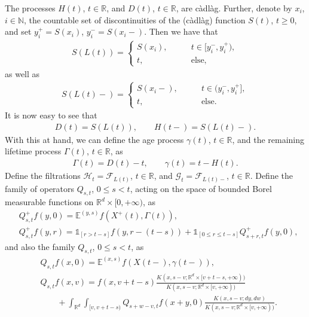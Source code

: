 \documentclass[reqno]{amsart}
\theoremstyle{remark}
\numberwithin{equation}{section} %
\newcommand{\NN}{\mathbb{N}}
\newcommand{\1}{\mathds{1}}
\begin{document}
	The processes $H(t)$, $t \in \mathbb{R}$, and $D(t)$, $t \in \mathbb{R}$, are càdlàg. Further, denote by $x_i$, $i\in\NN$, the countable set of discontinuities of the (càdlàg) function $S(t)$, $t\ge 0$,  and set $y_i^+ = S(x_i)$, $y_i^-=S(x_i-)$. Then we have that
	\begin{align}
		S(L(t)) = \begin{cases}
			S(x_i), \qquad & t \in [y_{i}^-, y_i^+), \\
			t, &  \text{else},
		\end{cases}
		\label{traj_over}
	\end{align}
	as well as
	\begin{align}
		S(L(t)-) = \begin{cases}
			S(x_i-), \qquad & t \in (y_{i}^-, y_i^+], \\
			t, &  \text{else.}
		\end{cases}
		\label{traj_under}
	\end{align}
	It is now easy to see that
	\begin{align}
		D(t) = S(L(t)) , \qquad H(t-) = S(L(t)-).
	\end{align}
	With this at hand, we can define the age process $\gamma(t)$, $t \in \mathbb{R}$, and the remaining lifetime process $\Gamma(t)$, $t \in \mathbb{R}$, as
	\begin{align}
		\Gamma (t) = D(t)-t, \qquad \gamma(t) = t-H(t).
	\end{align}
	Define the filtrations $\mathcal{H}_t= \mathcal{F}_{L(t)}$, $t \in \mathbb{R}$, and $\mathcal{G}_t = \mathcal{F}_{L(t)-}$, $t  \in \mathbb{R}$.
	Define the family of operators $Q_{s,t}$, $0 \leq s < t$, acting on the space of bounded Borel measurable functions on $\mathbb{R}^d \times [0, +\infty)$, as
	\begin{align}
		&  Q_{s,t}^+f (y,0)  = \mathds{E}^{(y,s)} f(X^+(t), \Gamma (t)), \\
		& Q_{s,t}^+ f(y,r) = \mathds{1}_{[r>t-s]} f(y,r-(t-s))+ \mathds{1}_{[0 \leq r \leq t-s]} Q_{s+r,t}^+f(y,0),
	\end{align}
	and also the family $Q_{s,t}$, $0 \leq s < t$, as
	\begin{align}
		&Q_{s,t}f(x,0) = \mathds{E}^{(x,s)} f(X(t-), \gamma(t-)), \\
		&Q_{s,t}f(x,v) = f(x,v+t-s) \frac{K(x,s-v; \mathbb{R}^d \times [v+t-s,+\infty))}{K(x,s-v; \mathbb{R}^d \times [v,+\infty))}  \\ & \qquad +  \int_{\mathbb{R}^d} \int_{[v,v+t-s)} Q_{s+w-v,t} f(x+y,0)  \frac{K(x,s-v;dy,dw)}{K(x,s-v; \mathbb{R}^d \times [v,+\infty))}.
	\end{align}
\end{document}
